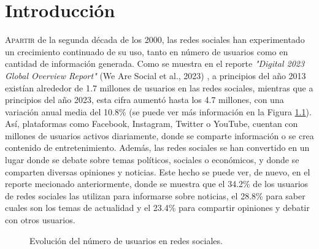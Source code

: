 \chapter{Introducción}
\label{chap:introduccion}

\lettrine{A}{partir} de la segunda década de los 2000, las redes sociales han experimentado
un crecimiento continuado de su uso, tanto en número de usuarios como en
cantidad de información generada. Como se muestra en el reporte \textit{"Digital 2023 Global Overview Report"} (We Are Social et al., 2023)
\cite{wearesocial}, a principios del año 2013 existían alrededor de 1.7 millones de usuarios en las redes sociales,
mientras que a principios del año 2023, esta cifra aumentó hasta los 4.7 millones, con una variación anual media del 10.8\% (se puede ver
más información en la Figura \ref{fig:usuarios_redes_sociales}).
Así, plataformas como Facebook, Instagram, Twitter o YouTube, cuentan con millones de usuarios activos diariamente,
donde se comparte información o se crea contenido de entretenimiento. Además, las redes sociales se han convertido en
un lugar donde se debate sobre temas políticos, sociales o económicos, y donde se comparten diversas opiniones y noticias. 
Este hecho se puede ver, de nuevo, en el reporte mecionado anteriormente, donde se muestra que el 34.2\% de los usuarios
de redes sociales las utilizan para informarse sobre noticias, el 28.8\% para saber cuales son los temas de actualidad
y el 23.4\% para compartir opiniones y debatir con otros usuarios.

\bigskip
\begin{figure}[H]
	\centering
	\caption{Evolución del número de usuarios en redes sociales.}
	\label{fig:usuarios_redes_sociales}
\end{figure}

